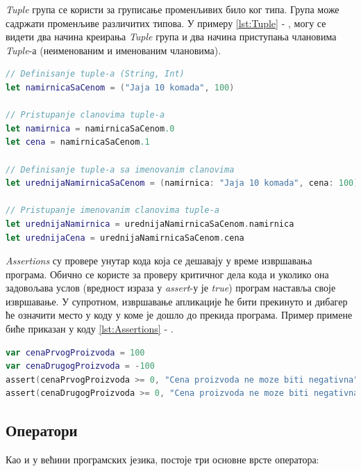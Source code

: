 \documentclass[12pt,oneside]{memoir}
\begin{document}
\indent \textit{Tuple} група се користи за груписање променљивих било ког типа. Група може садржати променљиве различитих типова. У примеру \ref{lst:Tuple} - , могу се видети два начина креирања \textit{Tuple} група и два начина приступања члановима \textit{Tuple}-а (неименованим и именованим члановима).

\begin{lstlisting}[caption=\textit{{Tuple}}, label={lst:Tuple}, language=Swift, frame=single]
// Definisanje tuple-a (String, Int)
let namirnicaSaCenom = ("Jaja 10 komada", 100)

// Pristupanje clanovima tuple-a
let namirnica = namirnicaSaCenom.0
let cena = namirnicaSaCenom.1

// Definisanje tuple-a sa imenovanim clanovima
let urednijaNamirnicaSaCenom = (namirnica: "Jaja 10 komada", cena: 100)

// Pristupanje imenovanim clanovima tuple-a
let urednijaNamirnica = urednijaNamirnicaSaCenom.namirnica
let urednijaCena = urednijaNamirnicaSaCenom.cena
\end{lstlisting}

\indent \textit{Assertions} су провере унутар кода која се дешавају у време извршавања програма. Обично се користе за проверу критичног дела кода и уколико она задовољава услов (вредност израза у \textit{assert}-у је \textit{true}) програм наставља своје извршавање. У супротном, извршавање апликације ће бити прекинуто и дибагер ће означити место у коду у коме је дошло до прекида програма. Пример примене биће приказан у коду \ref{lst:Assertions} - .

\begin{lstlisting}[caption=\textit{{Assertions}}, label={lst:Assertions}, language=Swift, frame=single]
var cenaPrvogProizvoda = 100
var cenaDrugogProizvoda = -100
assert(cenaPrvogProizvoda >= 0, "Cena proizvoda ne moze biti negativna") //true
assert(cenaDrugogProizvoda >= 0, "Cena proizvoda ne moze biti negativna") //false
\end{lstlisting}

\subsection{Оператори}

\indent Као и у већини програмских језика, постоје три основне врсте оператора: 
\end{document}
